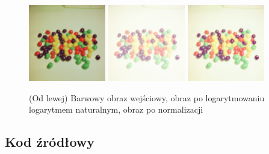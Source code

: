 \documentclass[final,a4paper,openany,12pt]{mwbk}
\begin{document}
\begin{figure}[H]
	\begin{center}
		\includegraphics[width=0.3\textwidth]{2/2Color_Log_Original}
		\includegraphics[width=0.3\textwidth]{2/2Color_Log_Result}
		\includegraphics[width=0.3\textwidth]{2/2Color_Log_Result_Norm}
	\end{center}
	\caption{(Od lewej) Barwowy obraz wejściowy, obraz po logarytmowaniu logarytmem naturalnym, obraz po normalizacji }
\end{figure}

\subsection*{Kod źródłowy}
\end{document}
